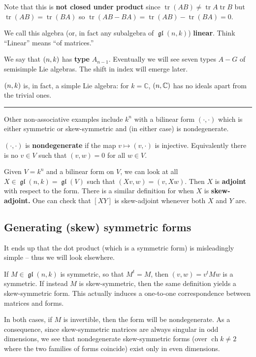 \documentclass[12pt]{article}
\theoremstyle{nonumberbreak}
\theoremstyle{changebreak}
\theoremstyle{nonumberbreak}
\theoremstyle{change}
\newcommand*{\C}{
\mathbb{C}
}
\newcommand*{\brk}{
\rule{2in}{.1pt}
}
\DeclareMathOperator{\ch}{ch}
\DeclareMathOperator{\gl}{\mathfrak{gl}}
\let\sl\relax
\DeclareMathOperator{\sl}{\mathfrak{sl}}
\DeclareMathOperator{\tr}{tr}
\begin{document}
Note that this is \textbf{not closed under product} since $\tr(AB)\ne\tr A\tr B$ but $\tr(AB)=\tr(BA)$
so $\tr(AB-BA)=\tr(AB)-\tr(BA)=0$.
\begin{defn}
	We call this algebra (or, in fact any subalgebra of $\gl(n,k)$) \textbf{linear}. Think 
	``Linear'' means ``of matrices.''
\end{defn}

We say that $\sl(n,k)$ has \textbf{type} $A_{n-1}$. Eventually we will see seven types
$A-G$ of semisimple Lie algebras. The shift in index will emerge later.

$\sl(n,k)$ is, in fact, a simple Lie algebra: for $k=\C$, $\sl(n,\C)$ has no ideals
apart from the trivial ones. 

\brk

Other non-associative examples include $k^n$ with a bilinear form $(\cdot,\cdot)$ which
is either symmetric or skew-symmetric and (in either case) is nondegenerate.
\begin{defn}
	$(\cdot,\cdot)$ is \textbf{nondegenerate} if the map $v\mapsto (v,\cdot)$ is injective. Equivalently
	there is no $v\in V$ such that $(v,w)=0$ for all $w\in V$.
\end{defn}

Given $V=k^n$ and a bilinear form on $V$, we can look at all $X\in \gl(n,k)=\gl(V)$ such that 
$(Xv,w)=(v,Xw)$. Then $X$ is \textbf{adjoint} with respect to the form. There is a similar definition for when
$X$ is \textbf{skew-adjoint.} One can check that 
$[XY]$ is skew-adjoint whenever both $X$ and $Y$ are.

\subsection{Generating (skew) symmetric forms}
It ends up that the dot product (which is a symmetric form) is misleadingly simple -- thus
we will look elsewhere.

If $M\in \gl(n,k)$ is symmetric, so that $M^t=M$, then $(v,w)=v^tMw$ is a symmetric. If 
instead $M$ is skew-symmetric, then the same definition yields a skew-symmetric form. 
This actually induces a one-to-one correspondence between matrices and forms.

In both cases, if $M$ is invertible, then the form will be nondegenerate. As a consequence, 
since skew-symmetric matrices are always singular in odd dimensions, we see that 
nondegenerate skew-symmetric forms (over $\ch k\ne 2$ where the two families of forms
coincide) exist only in even dimensions.
\end{document}
